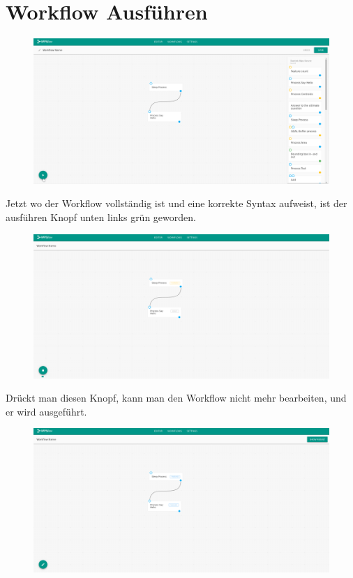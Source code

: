 \section{Workflow Ausführen}
    \begin{figure}[H]
        \centering
        \includegraphics[width=15.5cm]{images/Start Workflow.png}
        \label{start_workflow}
    \end{figure}
    Jetzt wo der Workflow vollständig ist und eine korrekte Syntax aufweist, ist der ausführen Knopf unten links grün geworden.
    \begin{figure}[H]
        \centering
        \includegraphics[width=15.5cm]{images/Running Workflow.png}
        \label{running_workflow}
    \end{figure}
    Drückt man diesen Knopf, kann man den Workflow nicht mehr bearbeiten, und er wird ausgeführt. 
    \begin{figure}[H]
        \centering
        \includegraphics[width=15.5cm]{images/Finished Workflow.png}
        \label{finished_workflow}
    \end{figure}
